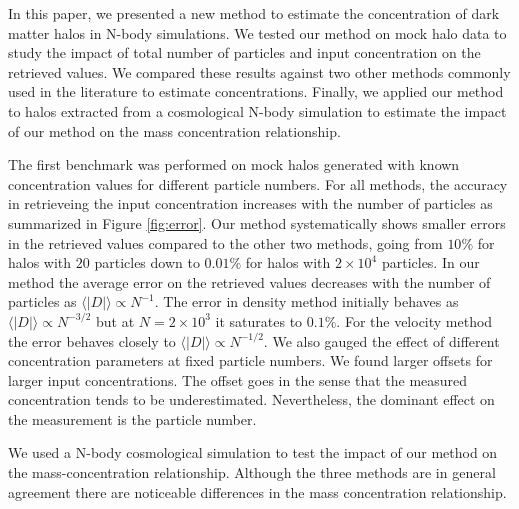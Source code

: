 \documentclass[a4,useAMS,usenatbib,usegraphicx]{mn2e}
\begin{document}
In this paper, we presented a new method to estimate the concentration
of dark matter halos in N-body simulations.  We tested our method on
mock halo data to study the impact of total number of particles and
input concentration on the retrieved values.  We compared these
results against two other methods commonly used in the literature to
estimate concentrations.  Finally, we applied our method to halos
extracted from a cosmological N-body simulation to estimate the impact
of our method on the mass concentration relationship.


The first benchmark was performed on mock halos generated with known
concentration values for different particle numbers.  For all methods,
the accuracy in retrieveing the input concentration increases with the
number of particles as summarized in Figure \ref{fig:error}.  Our
method systematically shows smaller errors in the retrieved values
compared to the other two methods, going from $10\%$ for halos with
$20$ particles down to $0.01\%$ for halos with $2\times 10^4$
particles.  In our method the average error on the retrieved values
decreases with the number of particles as $\langle|D|\rangle\propto
N^{-1}$.  The error in density method initially behaves as
$\langle|D|\rangle\propto N^{-3/2}$ but at $N=2\times 10^3$ it
saturates to $0.1\%$.  For the velocity method the error behaves
closely to $\langle|D|\rangle\propto N^{-1/2}$.  We also gauged the
effect of different concentration parameters at fixed particle
numbers.  We found larger offsets for larger input concentrations.
The offset goes in the sense that the measured concentration tends to
be underestimated.  Nevertheless, the dominant effect on the
measurement is the particle number.

We used a N-body cosmological simulation to test the impact of our
method on the mass-concentration relationship.  Although the three
methods are in general agreement there are noticeable differences in
the mass concentration relationship.





\end{document}

